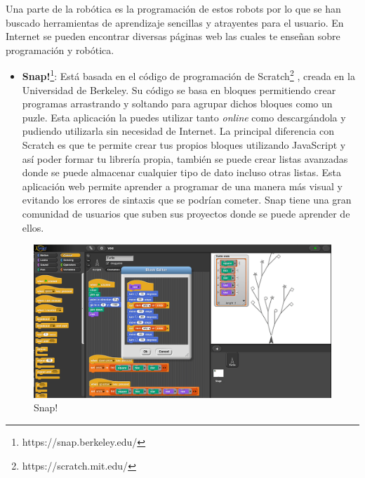 Una parte de la robótica es la programación de estos robots por lo que se han buscado herramientas de aprendizaje sencillas y atrayentes para el usuario. En Internet se pueden encontrar diversas páginas web las cuales te enseñan sobre programación y robótica.

\begin{itemize}
\item \textbf{Snap!}\footnote{https://snap.berkeley.edu/}: Está basada en el código de programación de Scratch\footnote{ https://scratch.mit.edu/} , creada en la Universidad de Berkeley. Su código se basa en bloques permitiendo crear programas arrastrando y soltando para agrupar dichos bloques como un puzle. Esta aplicación la puedes utilizar tanto \textit{online} como descargándola y pudiendo utilizarla sin necesidad de Internet. La principal diferencia con Scratch es que te permite crear tus propios bloques utilizando JavaScript y así poder formar tu librería propia, también se puede crear listas avanzadas donde se puede almacenar cualquier tipo de dato incluso otras listas.  Esta aplicación web permite aprender a programar de una manera más visual y evitando los errores de sintaxis que se podrían cometer. Snap tiene una gran comunidad de usuarios que suben sus proyectos donde se puede aprender de ellos.\cite{app}
\end{itemize}

\begin{figure}[H]
    \centering
    \includegraphics[width=15cm, keepaspectratio]{img/snap.png}
    \caption{Snap!}
    \label{fig:snap}
\end{figure}

